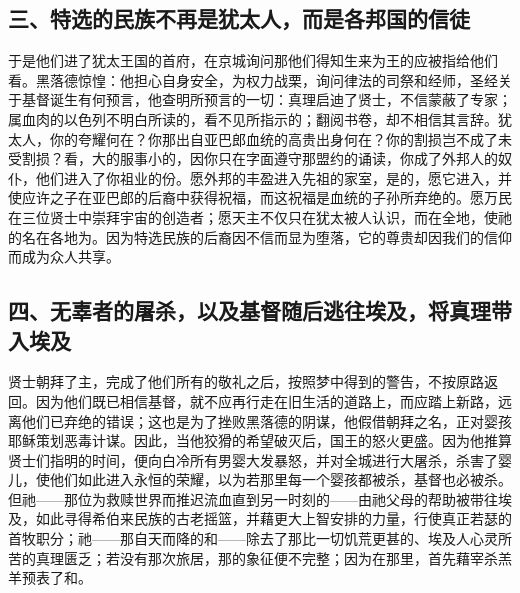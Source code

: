 
\subsection{三、特选的民族不再是犹太人，而是各邦国的信徒}

于是他们进了犹太王国的首府，在京城询问那他们得知生来为王的应被指给他们看。黑落德惊惶：他担心自身安全，为权力战栗，询问律法的司祭和经师，圣经关于基督诞生有何预言，他查明所预言的一切：真理启迪了贤士，不信蒙蔽了专家；属血肉的以色列不明白所读的，看不见所指示的；翻阅书卷，却不相信其言辞。犹太人，你的夸耀何在？你那出自亚巴郎血统的高贵出身何在？你的割损岂不成了未受割损？看，大的服事小的，因你只在字面遵守那盟约的诵读，你成了外邦人的奴仆，他们进入了你祖业的份。愿外邦的丰盈进入先祖的家室，是的，愿它进入，并使应许之子在亚巴郎的后裔中获得祝福，而这祝福是血统的子孙所弃绝的。愿万民在三位贤士中崇拜宇宙的创造者；愿天主不仅只在犹太被人认识，而在全地，使祂的名在各地为。因为特选民族的后裔因不信而显为堕落，它的尊贵却因我们的信仰而成为众人共享。\par


\subsection{四、无辜者的屠杀，以及基督随后逃往埃及，将真理带入埃及}

贤士朝拜了主，完成了他们所有的敬礼之后，按照梦中得到的警告，不按原路返回。因为他们既已相信基督，就不应再行走在旧生活的道路上，而应踏上新路，远离他们已弃绝的错误；这也是为了挫败黑落德的阴谋，他假借朝拜之名，正对婴孩耶稣策划恶毒计谋。因此，当他狡猾的希望破灭后，国王的怒火更盛。因为他推算贤士们指明的时间，便向白冷所有男婴大发暴怒，并对全城进行大屠杀，杀害了婴儿，使他们如此进入永恒的荣耀，以为若那里每一个婴孩都被杀，基督也必被杀。但祂——那位为救赎世界而推迟流血直到另一时刻的——由祂父母的帮助被带往埃及，如此寻得希伯来民族的古老摇篮，并藉更大上智安排的力量，行使真正若瑟的首牧职分；祂——那自天而降的和——除去了那比一切饥荒更甚的、埃及人心灵所苦的真理匮乏；若没有那次旅居，那的象征便不完整；因为在那里，首先藉宰杀羔羊预表了和。\par

